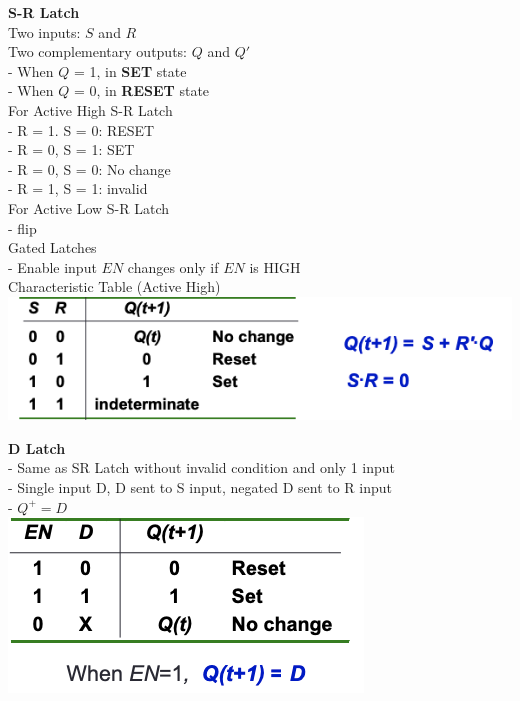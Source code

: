 \documentclass[10pt, a4paper]{article}
\newcommand{\highlight}[1]{{\color{red}\textbf{#1}}}
\begin{document}
\begin{multicols*}{3}
		\textbf{S-R Latch}\\
		Two inputs: $S$ and $R$\\
		Two complementary outputs: $Q$ and $Q'$\\
			- When $Q$ = 1, in \highlight{SET} state\\
			- When $Q$ = 0, in \highlight{RESET} state\\
		For Active High S-R Latch\\
			- R = 1. S = 0: RESET\\
			- R = 0, S = 1: SET\\
			- R = 0, S = 0: No change\\
			- R = 1, S = 1: invalid\\
		For Active Low S-R Latch\\
			- flip\\
		Gated Latches\\
			- Enable input $EN$ changes only if $EN$ is HIGH\\
		Characteristic Table (Active High)\\
		\includegraphics[scale=.5]{./assets/ActiveHighSRTable}
		
		\textbf{D Latch}\\
		- Same as SR Latch without invalid condition and only 1 input\\
		- Single input D, D sent to S input, negated D sent to R input\\
		- $Q^+ = D$\\
		\includegraphics[scale=.5]{./assets/DLatchTable}
		

\end{multicols*}
\end{document}
